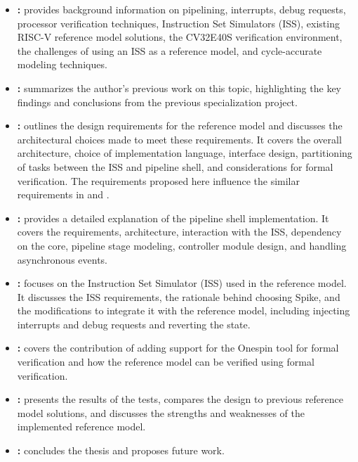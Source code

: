 \begin{itemize}
    \item \textbf{: } provides background information on pipelining, interrupts, debug requests, processor verification techniques, Instruction Set Simulators (ISS), existing RISC-V reference model solutions, the CV32E40S verification environment, the challenges of using an ISS as a reference model, and cycle-accurate modeling techniques.
    
    \item \textbf{: }  
    summarizes the author's previous work on this topic, highlighting the key findings and conclusions from the previous specialization project. %
    
    \item \textbf{: } 
    outlines the design requirements for the reference model and discusses the architectural choices made to meet these requirements. It covers the overall architecture, choice of implementation language, interface design, partitioning of tasks between the ISS and pipeline shell, and considerations for formal verification. The requirements proposed here influence the similar requirements in  and .
    
    \item \textbf{: }  
    provides a detailed explanation of the pipeline shell implementation. It covers the requirements, architecture, interaction with the ISS, dependency on the core, pipeline stage modeling, controller module design, and handling asynchronous events.%
    
    \item \textbf{: } 
    focuses on the Instruction Set Simulator (ISS) used in the reference model. It discusses the ISS requirements, the rationale behind choosing Spike, and the modifications to integrate it with the reference model, including injecting interrupts and debug requests and reverting the state.
    
    \item \textbf{: } covers the contribution of adding support for the Onespin tool for formal verification and how the reference model can be verified using formal verification.
    
    
    \item \textbf{: }
    presents the results of the tests, compares the design to previous reference model solutions, and discusses the strengths and weaknesses of the implemented reference model.
    
    \item \textbf{: } 
    concludes the thesis and proposes future work.
\end{itemize}

